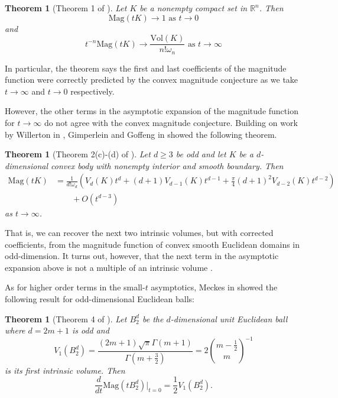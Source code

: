 \documentclass[11pt]{article}
\theoremstyle{mythm}
\newtheorem{theo}[defn]{Theorem}
\begin{document}
\begin{theo}[Theorem 1 of \cite{barcelo_magnitudes_2016}]\label{theo:bcasym}
Let $K$ be a nonempty compact set in $\mathbb{R}^n$. Then
\begin{equation*}
\text{Mag}(tK) \to 1 \text{ as $t \to 0$}
\end{equation*}
and
\begin{equation*}
t^{-n}\text{Mag}(tK) \to \frac{\text{Vol}(K)}{n!\omega_n} \text{ as $t\to\infty$}
\end{equation*}
\end{theo}

In particular, the theorem says the first and last coefficients of the magnitude function were correctly predicted by the convex magnitude conjecture as we take $t \to\infty$ and $t\to0$ respectively.

However, the other terms in the asymptotic expansion of the magnitude function for $t\to\infty$ do not agree with the convex magnitude conjecture. Building on work by Willerton in \cite{willerton_magnitude_2017}, Gimperlein and Goffeng in \cite{gimperlein_magnitude_2017} showed the following theorem.

\begin{theo}[Theorem 2(c)-(d) of \cite{gimperlein_magnitude_2017}]\label{theo:largeasym}
Let $d\geq3$ be odd and let $K$ be a $d$-dimensional convex body with nonempty interior and smooth boundary. Then
\begin{align*}
\text{Mag}(tK) &= \frac{1}{d!\omega_d}\left(V_d(K)t^d+(d+1)V_{d-1}(K)t^{d-1}+\frac{\pi}{4}(d+1)^2V_{d-2}(K)t^{d-2}\right) \\
&\qquad+ O(t^{d-3})
\end{align*}
as $t\to\infty$.
\end{theo}

That is, we can recover the next two intrinsic volumes, but with corrected coefficients, from the magnitude function of convex smooth Euclidean domains in odd-dimension. It turns out, however, that the next term in the asymptotic expansion above is not a multiple of an intrinsic volume \cite{meckes_magnitude_2019}.

As for higher order terms in the small-$t$ asymptotics, Meckes in \cite{meckes_magnitude_2019} showed the following result for odd-dimensional Euclidean balls:

\begin{theo}[Theorem 4 of \cite{meckes_magnitude_2019}]\label{theo:firstorder}
Let $B_2^d$ be the $d$-dimensional unit Euclidean ball where $d = 2m+1$ is odd and
\begin{equation*}
V_1\left(B_2^d\right) = \frac{(2m+1)\sqrt{\pi}\Gamma(m+1)}{\Gamma\left(m+\frac{3}{2}\right)} = 2\binom{m-\frac{1}{2}}{m}^{-1}
\end{equation*}
is its first intrinsic volume. Then
\begin{equation*}
\frac{d}{dt}\text{Mag}(tB_2^d)\big\vert_{t=0} = \frac{1}{2}V_1(B_2^d).
\end{equation*}
\end{theo}
\end{document}
